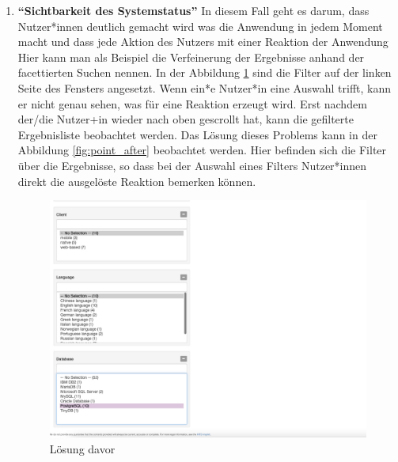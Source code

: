\begin{enumerate}
\item \textbf{\enquote{Sichtbarkeit des Systemstatus}} \newline
In diesem Fall geht es darum, dass Nutzer*innen deutlich gemacht wird was die Anwendung in jedem Moment macht und dass jede Aktion des Nutzers mit einer Reaktion der Anwendung 
Hier kann man als Beispiel die Verfeinerung der Ergebnisse anhand der facettierten Suchen nennen.
In der Abbildung \ref{fig:point1_before} sind die Filter auf der linken Seite des Fensters angesetzt.
Wenn ein*e Nutzer*in eine Auswahl trifft, kann er nicht genau sehen, was für eine Reaktion erzeugt wird.
Erst nachdem der/die Nutzer+in wieder nach oben gescrollt hat, kann die gefilterte Ergebnisliste beobachtet werden.
Das Lösung dieses Problems kann in der Abbildung \ref{fig:point_after} beobachtet werden.
Hier befinden sich die Filter über die Ergebnisse, so dass bei der Auswahl eines Filters Nutzer*innen direkt die ausgelöste Reaktion bemerken können.

\begin{figure}[H]
	\centering
    	\includegraphics[width=\textwidth]{Images/Punkt_1_davor}
   	\caption{Lösung davor}
   	\label{fig:point1_before}
\end{figure}



\end{enumerate}
